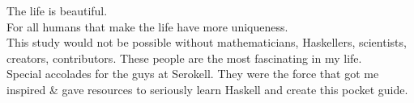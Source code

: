 \documentclass[11pt]{article}
\begin{document}
The life is beautiful.\\
For all humans that make the life have more uniqueness.\\

This study would not be possible without mathematicians, Haskellers, scientists, creators, contributors. These people are the most fascinating in my life.\\

Special accolades for the guys at Serokell. They were the force that got me inspired \& gave resources to seriously learn Haskell and create this pocket guide.\\
\end{document}
